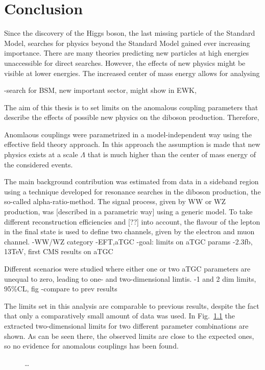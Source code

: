\chapter{Conclusion}
\label{ch:Conclusion}
Since the discovery of the Higgs boson, the last missing particle of the Standard Model, searches for physics beyond the Standard Model gained ever increasing importance. There are many theories predicting new particles at high energies unaccessible for direct searches. However, the effects of new physics might be visible at lower energies. The increased center of mass energy allows for analysing 

-search for BSM, new important sector, might show in EWK,

The aim of this thesis is to set limits on the anomalous coupling parameters that describe the effects of possible new physics on the diboson production. Therefore, 

Anomlaous couplings were parametrized in a model-independent way using the effective field theory approach. In this approach the assumption is made that new physics exists at a scale $\Lambda$ that is much higher than the center of mass energy of the considered events.

The main background contribution was estimated from data in a sideband region using a technique developed for resonance searches in the diboson production, the so-called alpha-ratio-method. The signal process, given by WW or WZ production, was [described in a parametric way] using a generic model.
To take different reconstruction efficiencies and [??] into account, the flavour of the lepton in the final state is used to define two channels, given by the electron and muon channel.
-WW/WZ category
-EFT,aTGC
-goal: limits on aTGC params
-2.3fb, 13TeV, first CMS results on aTGC

Different scenarios were studied where either one or two aTGC parameters are unequal to zero, leading to one- and two-dimensional limtis. 
-1 and 2 dim limits, 95\%CL, fig
-compare to prev results

The limits set in this analysis are comparable to previous results, despite the fact that only a comparatively small amount of data was used. In Fig.~\ref{} the extracted two-dimensional limits for two different parameter combinations are shown. As can be seen there, the observed limits are close to the expected ones, so no evidence for anomalous couplings has been found.

\begin{figure}
    \centering
    \caption[]{\dots}
    \label{}
\end{figure}